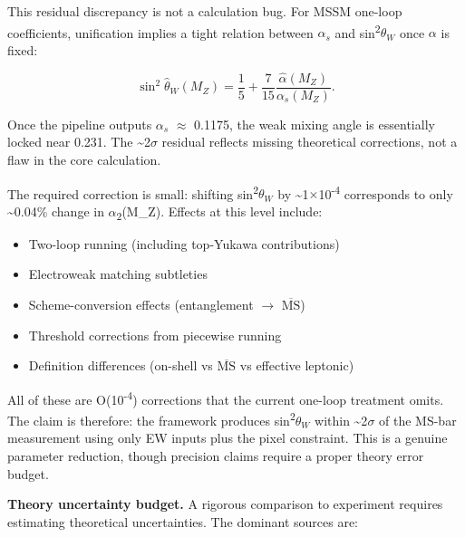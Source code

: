 \documentclass[11pt,a4paper]{article}
\theoremstyle{remark}
\providecommand{\tightlist}{%
  \setlength{\itemsep}{0pt}\setlength{\parskip}{0pt}}
\begin{document}
This residual discrepancy is not a calculation bug. For MSSM one-loop coefficients,
unification implies a tight relation between \(\alpha_s\) and sin\textsuperscript{2}\(\theta_W\) once \ensuremath{\alpha} is fixed:

\[
\sin^2\hat{\theta}_W(M_Z) = \frac{1}{5} + \frac{7}{15}\frac{\hat{\alpha}(M_Z)}{\alpha_s(M_Z)}.
\]

Once the pipeline outputs \(\alpha_s\) \ensuremath{\approx} 0.1175, the weak mixing angle is essentially
locked near 0.231. The \textasciitilde2\ensuremath{\sigma} residual reflects missing theoretical corrections,
not a flaw in the core calculation.

The required correction is small: shifting sin\textsuperscript{2}\(\theta_W\) by \textasciitilde1\ensuremath{\times}10\textsuperscript{-4} corresponds to
only \textasciitilde0.04\% change in \ensuremath{\alpha}\textsubscript{2}(M\_Z). Effects at this level include:

\begin{itemize}
\tightlist
\item
  Two-loop running (including top-Yukawa contributions)
\item
  Electroweak matching subtleties
\item
  Scheme-conversion effects (entanglement \ensuremath{\to} \(\overline{\text{MS}}\))
\item
  Threshold corrections from piecewise running
\item
  Definition differences (on-shell vs \(\overline{\text{MS}}\) vs effective leptonic)
\end{itemize}

All of these are O(10\textsuperscript{-4}) corrections that the current one-loop treatment
omits. The claim is therefore: the framework produces sin\textsuperscript{2}\(\theta_W\) within \textasciitilde2\ensuremath{\sigma}
of the MS-bar measurement using only EW inputs plus the pixel constraint.
This is a genuine parameter reduction, though precision claims require a
proper theory error budget.

\textbf{Theory uncertainty budget.} A rigorous comparison to experiment requires
estimating theoretical uncertainties. The dominant sources are:
\end{document}
